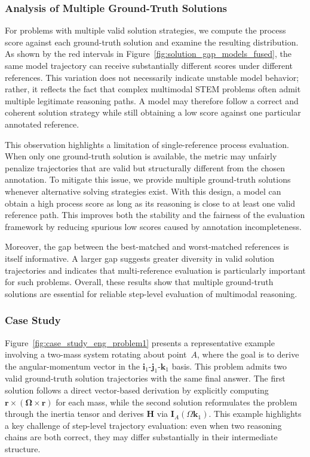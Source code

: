 \documentclass[11pt]{article}
\begin{document}
\subsubsection{Analysis of Multiple Ground-Truth Solutions}

For problems with multiple valid solution strategies, we compute the process score against each ground-truth solution and examine the resulting distribution. As shown by the red intervals in Figure~\ref{fig:solution_gap_models_fused}, the same model trajectory can receive substantially different scores under different references. This variation does not necessarily indicate unstable model behavior; rather, it reflects the fact that complex multimodal STEM problems often admit multiple legitimate reasoning paths. A model may therefore follow a correct and coherent solution strategy while still obtaining a low score against one particular annotated reference.

This observation highlights a limitation of single-reference process evaluation. When only one ground-truth solution is available, the metric may unfairly penalize trajectories that are valid but structurally different from the chosen annotation. To mitigate this issue, we provide multiple ground-truth solutions whenever alternative solving strategies exist. With this design, a model can obtain a high process score as long as its reasoning is close to at least one valid reference path. This improves both the stability and the fairness of the evaluation framework by reducing spurious low scores caused by annotation incompleteness.

Moreover, the gap between the best-matched and worst-matched references is itself informative. A larger gap suggests greater diversity in valid solution trajectories and indicates that multi-reference evaluation is particularly important for such problems. Overall, these results show that multiple ground-truth solutions are essential for reliable step-level evaluation of multimodal reasoning.

\subsubsection{Case Study}

Figure~\ref{fig:case_study_eng_problem1} presents a representative example involving a two-mass system rotating about point~$A$, where the goal is to derive the angular-momentum vector in the $\mathbf{i}_1$-$\mathbf{j}_1$-$\mathbf{k}_1$ basis. This problem admits two valid ground-truth solution trajectories with the same final answer. The first solution follows a direct vector-based derivation by explicitly computing $\mathbf{r}\times(\boldsymbol{\Omega}\times\mathbf{r})$ for each mass, while the second solution reformulates the problem through the inertia tensor and derives $\mathbf{H}$ via $\mathbf{I}_A(\Omega \mathbf{k}_1)$. This example highlights a key challenge of step-level trajectory evaluation: even when two reasoning chains are both correct, they may differ substantially in their intermediate structure.
\end{document}
